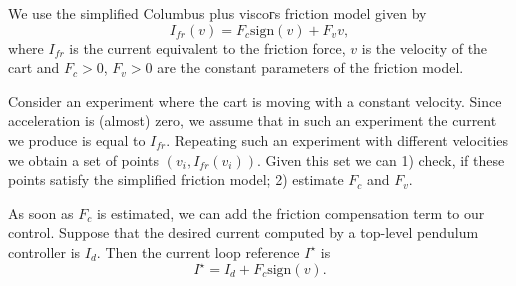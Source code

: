 \documentclass{article}
\begin{document}
We use the simplified Columbus plus viscoгs friction model given by
\[
    I_{fr}(v) = F_c\mathrm{sign}(v) + F_v v,
\]
where $I_{fr}$ is the current equivalent to the friction force, $v$ is the velocity of the cart and $F_c>0$, $F_v>0$ are the constant parameters of the friction model.

Consider an experiment where the cart is moving with a constant velocity. Since acceleration is (almost) zero, we assume that in such an experiment the current we produce is equal to $I_{fr}$. Repeating such an experiment with different velocities we obtain a set of points $(v_i,I_{fr}(v_i))$. Given this set we can 1) check, if these points satisfy the simplified friction model; 2) estimate $F_c$ and $F_v$.

As soon as $F_c$ is estimated, we can add the friction compensation term to our control. Suppose that the desired current computed by a top-level pendulum controller is $I_{d}$. Then the current loop reference $I^\star$ is
\[
    I^\star = I_d + F_c\mathrm{sign}(v).
\]
\end{document}
